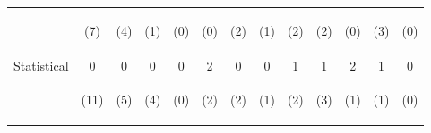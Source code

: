 \begin{tabular}{lcccccccccccc}
 & \begin{footnotesize}(7)\end{footnotesize} & \begin{footnotesize}(4)\end{footnotesize} & \begin{footnotesize}(1)\end{footnotesize} & \begin{footnotesize}(0)\end{footnotesize} & \begin{footnotesize}(0)\end{footnotesize} & \begin{footnotesize}(2)\end{footnotesize} & \begin{footnotesize}(1)\end{footnotesize} & \begin{footnotesize}(2)\end{footnotesize} & \begin{footnotesize}(2)\end{footnotesize} & \begin{footnotesize}(0)\end{footnotesize} & \begin{footnotesize}(3)\end{footnotesize} & \begin{footnotesize}(0)\end{footnotesize}\\
\noalign{\smallskip}Statistical & 0 & 0 & 0 & 0 & 2 & 0 & 0 & 1 & 1 & 2 & 1 & 0\\
 & \begin{footnotesize}(11)\end{footnotesize} & \begin{footnotesize}(5)\end{footnotesize} & \begin{footnotesize}(4)\end{footnotesize} & \begin{footnotesize}(0)\end{footnotesize} & \begin{footnotesize}(2)\end{footnotesize} & \begin{footnotesize}(2)\end{footnotesize} & \begin{footnotesize}(1)\end{footnotesize} & \begin{footnotesize}(2)\end{footnotesize} & \begin{footnotesize}(3)\end{footnotesize} & \begin{footnotesize}(1)\end{footnotesize} & \begin{footnotesize}(1)\end{footnotesize} & \begin{footnotesize}(0)\end{footnotesize}\\

\end{tabular}
